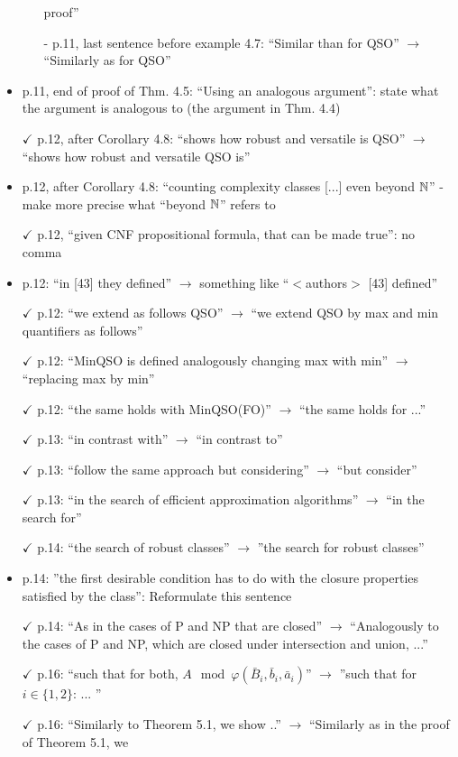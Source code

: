 \begin{itemize}
\begin{itemize}
	proof''
	\item[-] p.11, last sentence before example 4.7: ``Similar than for QSO'' $\to$ ``Similarly as for QSO''
	\end{itemize}
	\item p.11, end of proof of Thm. 4.5: ``Using an analogous argument'': state what the argument is
	analogous to (the argument in Thm. 4.4)
	\item[$\checkmark$] p.12, after Corollary 4.8: ``shows how robust and versatile is QSO'' $\to$ ``shows how robust and
	versatile QSO is''
	\item p.12, after Corollary 4.8: ``counting complexity classes [...] even beyond $\mathbb{N}$'' - make more precise
	what ``beyond $\mathbb{N}$'' refers to
	\item[$\checkmark$] p.12, ``given CNF propositional formula, that can be made true'': no comma
	\item p.12: ``in [43] they defined'' $\to$ something like ``$<$authors$>$ [43] defined''
	\item[$\checkmark$] p.12: ``we extend as follows QSO'' $\to$ ``we extend QSO by max and min quantifiers as follows''
	\item[$\checkmark$] p.12: ``MinQSO is defined analogously changing max with min'' $\to$ ``replacing max by min''
	\item[$\checkmark$] p.12: ``the same holds with MinQSO(FO)'' $\to$ ``the same holds for ...''
	\item[$\checkmark$] p.13: ``in contrast with'' $\to$ ``in contrast to''
	\item[$\checkmark$] p.13: ``follow the same approach but considering'' $\to$ ``but consider''
	\item[$\checkmark$] p.13: ``in the search of efficient approximation algorithms'' $\to$ ``in the search for''
	\item[$\checkmark$] p.14: ``the search of robust classes'' $\to$ ''the search for robust classes''
	\item p.14: ''the first desirable condition has to do with the closure properties satisfied by the class'':
	Reformulate this sentence
	\item[$\checkmark$] p.14: ``As in the cases of P and NP that are closed'' $\to$ ``Analogously to the cases of P and
	NP, which are closed under intersection and union, ...''
	\item[$\checkmark$] p.16: ``such that for both, $A\mod\varphi(\bar{B}_i,\bar{b}_i,\bar{a}_i)$'' $\to$ ''such that for $i \in \{1,2\}$: ... ''
	\item[$\checkmark$] p.16: ``Similarly to Theorem 5.1, we show ..'' $\to$ ``Similarly as in the proof of Theorem 5.1, we

\end{itemize}
